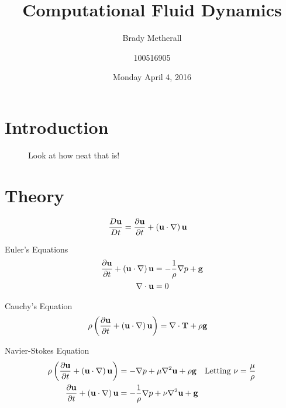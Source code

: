 \documentclass[10pt]{article}
\title{Computational Fluid Dynamics}
\author{Brady Metherall \and 100516905}
\date{Monday April 4, 2016}
\begin{document}
\maketitle
\setlength\parindent{0pt}
\lstset{language=myMMA}

\section{Introduction}

\begin{wrapfigure}{R}{0.5\textwidth}
\centering
{}
\caption[Pitching Airfoil Animation]{Look at how neat that is!}
\label{fig:airfoilanimation}
\end{wrapfigure}

\lipsum[1-4]

\newpage
\listoffigures
\newpage

\section{Theory}
\lipsum[1-2]

\begin{align*}
\frac{D\bf{u}}{Dt} &= \frac{\partial \bf{u}}{\partial t} + \left( \bf{u} \cdot \nabla \right) \bf{u}
\end{align*}

Euler's Equations
\begin{equation}
\label{euler}
\begin{aligned}
\frac{\partial \bf{u}}{\partial t} + \left( \bf{u} \cdot \nabla \right) \bf{u} &= - \frac{1}{\rho} \nabla p + \bf{g} \\
\nabla \cdot \bf{u} &= 0
\end{aligned}
\end{equation}

Cauchy's Equation
\begin{align}
\rho \left( \frac{\partial \bf{u}}{\partial t} + \left( \bf{u} \cdot \nabla \right) \bf{u} \right) &= \nabla \cdot \bf{T} + \rho \bf{g}
\end{align}

Navier-Stokes Equation
\begin{equation}
\begin{aligned}
\rho \left( \frac{\partial \bf{u}}{\partial t} + \left( \bf{u} \cdot \nabla \right) \bf{u} \right) &= - \nabla p + \mu \nabla^2 \bf{u} + \rho \bf{g} \quad \text{Letting } \nu = \frac{\mu}{\rho} \\
\frac{\partial \bf{u}}{\partial t} + \left( \bf{u} \cdot \nabla \right) \bf{u} &= - \frac{1}{\rho} \nabla p + \nu \nabla^2 \bf{u} + \bf{g}
\end{aligned}
\end{equation}
\end{document}
